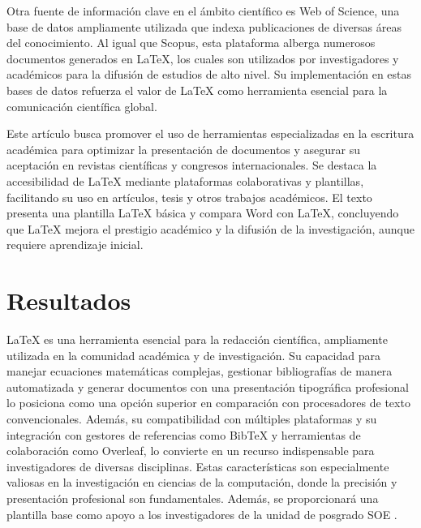 \documentclass[12pt,twocolumn]{article}
\begin{document}
Otra fuente de información clave en el ámbito científico es Web of Science, una base de datos ampliamente utilizada que indexa publicaciones de diversas áreas del conocimiento. 
Al igual que Scopus, esta plataforma alberga numerosos documentos generados en LaTeX, los cuales son utilizados por investigadores y académicos para la difusión de estudios de alto nivel. 
Su implementación en estas bases de datos refuerza el valor de LaTeX como herramienta esencial para la comunicación científica global.

Este artículo busca promover el uso de herramientas especializadas en la escritura académica para optimizar la presentación de documentos y asegurar su aceptación en revistas científicas y congresos internacionales. 
Se destaca la accesibilidad de LaTeX mediante plataformas colaborativas y plantillas, facilitando su uso en artículos, tesis y otros trabajos académicos. 
El texto presenta una plantilla LaTeX básica y compara Word con LaTeX, concluyendo que LaTeX mejora el prestigio académico y la difusión de la investigación, aunque requiere aprendizaje inicial.

\newpage %
\vspace{0.5cm}

    \section{Resultados}
    LaTeX es una herramienta esencial para la redacción científica, ampliamente utilizada en la comunidad académica y de investigación. 
    Su capacidad para manejar ecuaciones matemáticas complejas, gestionar bibliografías de manera automatizada y generar documentos con una presentación tipográfica profesional lo posiciona como una opción superior en comparación con procesadores de texto convencionales. 
    Además, su compatibilidad con múltiples plataformas y su integración con gestores de referencias como BibTeX y herramientas de colaboración como Overleaf, lo convierte en un recurso indispensable para investigadores de diversas disciplinas. 
    Estas características son especialmente valiosas en la investigación en ciencias de la computación, donde la precisión y presentación profesional son fundamentales. 
    Además, se proporcionará una plantilla base como apoyo a los investigadores de la unidad de posgrado SOE \parencite{rivera2023inteligencias}.
\end{document}
